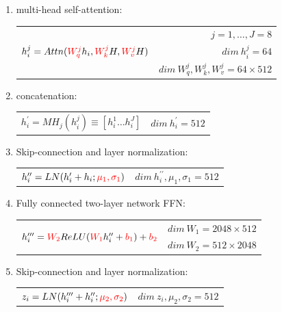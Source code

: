 \documentclass[fullscreen=true, bookmarks=true, hyperref={pdfencoding=unicode}]{beamer}
\begin{document}
\begin{frame}
\begin{columns}
\begin{column}{.78\paperwidth}
\begin{enumerate}
          \pause
          \item multi-head self-attention:

          \begin{tabular}{lr}
            \multirow{3}{*}{$h_i^j = Attn({\color{red}W_q^j} h_{i}, {\color{red} W_k^j} H, {\color{red}W_v^j} H)$} &
            ${\scriptscriptstyle j = 1, \dots, J = 8}$ \\
            &${\scriptscriptstyle dim\ h_i^j = 64}$ \\
            &${\scriptscriptstyle dim\ W_q^j, W_k^j, W_v^j = 64 \times 512}$
          \end{tabular}
          \pause
          \item concatenation:

          \begin{tabular}{lr}
            $h_i^\prime = MH_j(h_i^j) \equiv [h_i^1 \dots h_i^J]$ & ${\scriptscriptstyle dim\ h_i^\prime = 512}$
          \end{tabular}
          \pause
          \item Skip-connection and layer normalization:

          \begin{tabular}{lr}
            $h_i^{\prime\prime} = LN(h_i^\prime + h_i; {\color{red}\mu_1, \sigma_1})$ & ${\scriptscriptstyle dim\ h_i^{\prime\prime}, \mu_1, \sigma_1 = 512}$
          \end{tabular}
          \pause
          \item Fully connected two-layer network FFN:

          \begin{tabular}{lr}
            \multirow{2}{*}{$h_i^{\prime\prime\prime} = {\color{red} W_2} ReLU({\color{red} W_1}h_i^{\prime\prime} + {\color{red} b_1}) + {\color{red} b_2}$} & 
            ${\scriptscriptstyle dim\ W_1 = 2048 \times 512}$ \\
                   & ${\scriptscriptstyle dim\ W_2 = 512 \times 2048}$
          \end{tabular}
          \pause
          \item Skip-connection and layer normalization:

          \begin{tabular}{lr}
            $z_i = LN(h_i^{\prime\prime\prime} + h_i^{\prime\prime}; {\color{red}\mu_2, \sigma_2})$ & ${\scriptscriptstyle dim\ z_i, \mu_2, \sigma_2 = 512}$
          \end{tabular}
        \end{enumerate}
      \end{column}
    \end{columns}
\end{frame}
\end{document}
